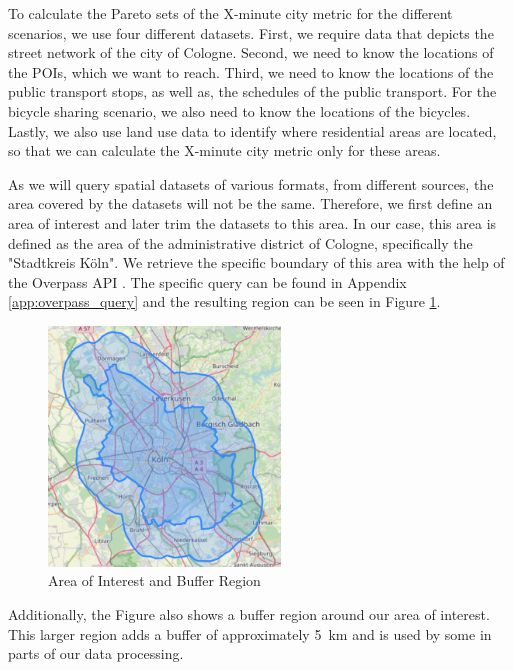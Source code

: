 To calculate the Pareto sets of the X-minute city metric for the different scenarios, we use four different datasets.
First, we require data that depicts the street network of the city of Cologne.
Second, we need to know the locations of the POIs, which we want to reach.
Third, we need to know the locations of the public transport stops, as well as, the schedules of the public transport.
For the bicycle sharing scenario, we also need to know the locations of the bicycles.
Lastly, we also use land use data to identify where residential areas are located, so that we can calculate the X-minute city metric only for these areas.

As we will query spatial datasets of various formats, from different sources, the area covered by the datasets will not be the same.
Therefore, we first define an area of interest and later trim the datasets to this area.
In our case, this area is defined as the area of the administrative district of Cologne, specifically the "Stadtkreis Köln".
We retrieve the specific boundary of this area with the help of the Overpass API .
The specific query can be found in Appendix \ref{app:overpass_query} and the resulting region can be seen in Figure \ref{fig:area_plus_buffer}.

\begin{figure}
  \begin{center}
    \includegraphics[width=0.55\textwidth]{Figures/experiment/area_plus_buffer.png}
  \end{center}
  \caption{Area of Interest and Buffer Region}\label{fig:area_plus_buffer}
\end{figure}

Additionally, the Figure also shows a buffer region around our area of interest.
This larger region adds a buffer of approximately 5 km and is used by some in parts of our data processing.


